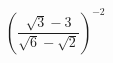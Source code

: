 \begin{ex}[type=calculate]
	\begin{condition}
		\( \left( \dfrac{\sqrt{3}-3}{\sqrt{6}-\sqrt{2}} \right)^{-2} \)
	\end{condition}
\end{ex}